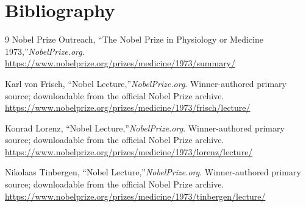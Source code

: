 \section{Bibliography}

\begin{thebibliography}{9}
Nobel Prize Outreach, ``The Nobel Prize in Physiology or Medicine 1973,''\emph{NobelPrize.org}.\\
\url{https://www.nobelprize.org/prizes/medicine/1973/summary/}

Karl von Frisch, ``Nobel Lecture,''\emph{NobelPrize.org}. Winner-authored primary source; downloadable from the official Nobel Prize archive.\\
\url{https://www.nobelprize.org/prizes/medicine/1973/frisch/lecture/}

Konrad Lorenz, ``Nobel Lecture,''\emph{NobelPrize.org}. Winner-authored primary source; downloadable from the official Nobel Prize archive.\\
\url{https://www.nobelprize.org/prizes/medicine/1973/lorenz/lecture/}

Nikolaas Tinbergen, ``Nobel Lecture,''\emph{NobelPrize.org}. Winner-authored primary source; downloadable from the official Nobel Prize archive.\\
\url{https://www.nobelprize.org/prizes/medicine/1973/tinbergen/lecture/}
\end{thebibliography}
